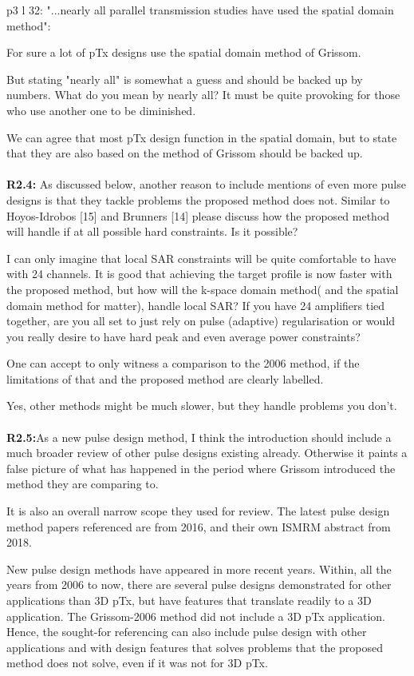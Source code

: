 \documentclass[11pt]{article}
\begin{document}
p3 l 32: "...nearly all parallel transmission studies have used the spatial domain method":

For sure a lot of pTx designs use the spatial domain method of Grissom.

But stating "nearly all" is somewhat a guess and should be backed up by numbers. What do you mean by nearly all? It must be quite provoking for those who use another one to be diminished.

We can agree that most pTx design function in the spatial domain, but to state that they are also based on the method of Grissom should be backed up.
\\[0.2em]
\indent{\it \textcolor{blue}{Done.}}
\\[1.2em]

{\bf R2.4:} As discussed below, another reason to include mentions of even more pulse designs is that they tackle problems the proposed method does not. Similar to Hoyos-Idrobos [15] and Brunners [14] please discuss how the proposed method will handle if at all possible hard constraints. Is it possible?

I can only imagine that local SAR constraints will be quite comfortable to have with 24 channels. It is good that achieving the target profile is now faster with the proposed method, but how will the k-space domain method( and the spatial domain method for matter), handle local SAR? If you have 24 amplifiers tied together, are you all set to just rely on pulse (adaptive) regularisation or would you really desire to have hard peak and even average power constraints?

One can accept to only witness a comparison to the 2006 method, if the limitations of that and the proposed method are clearly labelled.

Yes, other methods might be much slower, but they handle problems you don't.
\\[0.2em]
\indent{\it \textcolor{blue}{Done.}}
\\[1.2em]

{\bf R2.5:}As a new pulse design method, I think the introduction should include a much broader review of other pulse designs existing already. Otherwise it paints a false picture of what has happened in the period where Grissom introduced the method they are comparing to.

It is also an overall narrow scope they used for review. The latest pulse design method papers referenced are from 2016, and their own ISMRM abstract from 2018.

New pulse design methods have appeared in more recent years. Within, all the years from 2006 to now, there are several pulse designs demonstrated for other applications than 3D pTx, but have features that translate readily to a 3D application. The Grissom-2006 method did not include a 3D pTx application. Hence, the sought-for referencing can also include pulse design with other applications and with design features that solves problems that the proposed method does not solve, even if it was not for 3D pTx.
\\[0.2em]
\indent{\it \textcolor{blue}{Done.}}
\\[1.2em]
\end{document}
